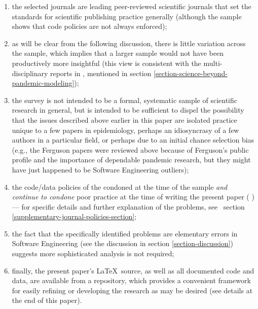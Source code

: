 \documentclass[10pt,a4paper]{article}
\begin{document}
\begin{enumerate}
\item the selected journals are leading peer-reviewed scientific journals that set the standards for scientific publishing practice generally (although the sample shows that code policies are not always enforced); 

\item as will be clear from the following discussion, there is little variation across the sample, which implies that a larger sample would not have been productively more insightful (this view is consistent with the multi-disciplinary reports in \cite{nature-review}, mentioned in section \ref{section-science-beyond-pandemic-modeling}); 

\item the survey is not intended to be a formal, systematic sample of scientific research in general, but is intended to be sufficient to dispel the possibility that the issues described above earlier in this paper are isolated practice unique to a few papers in epidemiology, perhaps an idiosyncrasy of a few authors in a particular field, or perhaps due to an initial chance selection bias (e.g., the Ferguson papers were reviewed above because of Ferguson's public profile and the importance of dependable pandemic research, but they might have just happened to be Software Engineering outliers);

\item the code/data policies of the  condoned at the time of the sample \emph{and continue to condone\/} poor practice at the time of writing the present paper (\monthname{\month} \the\year) --- for specific details and further explanation of the problems, see \supplement\ section \ref{supplementary-journal-policies-section};

\item
the fact that the specifically identified problems are elementary errors in Software Engineering (see the discussion in section \ref{section-discussion}) suggests more sophisticated analysis is not required;

\item 
finally, the present paper's \LaTeX\ source, as well as all documented code and data, are available from a repository, which provides a convenient framework for easily refining or developing the research as may be desired (see details at the end of this paper).
\end{enumerate}
\end{document}
